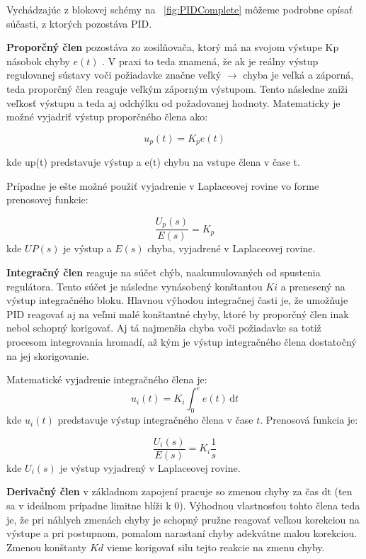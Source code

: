 Vychádzajúc z blokovej schémy na \figurename~\ref{fig:PIDComplete} môžeme podrobne opísať súčasti, z ktorých pozostáva \ac{PID}.

\textbf {Proporčný člen} pozostáva zo zosilňovača, ktorý má na svojom výstupe Kp násobok chyby $e(t)$ . V praxi to teda znamená, že ak je reálny výstup regulovanej sústavy voči požiadavke značne veľký $\rightarrow$ chyba je veľká a záporná, teda proporčný člen reaguje veľkým záporným výstupom. Tento následne zníži veľkosť výstupu a teda aj odchýlku od požadovanej hodnoty. Matematicky je možné vyjadriť výstup proporčného člena ako:

\begin{equation}
u_p (t)= K_p e( t )
\end{equation}

kde up(t) predstavuje výstup a e(t) chybu na vstupe člena v čase t. 

Prípadne je ešte možné použiť vyjadrenie v Laplaceovej rovine vo forme prenosovej funkcie:

\begin{equation}
\dfrac {U_p(s)} {E(s)} = K_p 
\end{equation}
kde $UP(s)$ je výstup a $E(s)$ chyba, vyjadrené v Laplaceovej rovine.

\textbf{Integračný člen} reaguje na súčet chýb, naakumulovaných od spustenia regulátora. Tento súčet je následne vynásobený konštantou $Ki$ a prenesený na výstup integračného bloku. Hlavnou výhodou integračnej časti je, že umožňuje \ac{PID} reagovať aj na veľmi malé konštantné chyby, ktoré by proporčný člen inak nebol schopný korigovať. Aj tá najmenšia chyba voči požiadavke sa totiž procesom integrovania hromadí, až kým je výstup integračného člena dostatočný na jej skorigovanie. 

Matematické vyjadrenie integračného člena je:
\begin{equation}
u_i (t)= K_i \int_0^e \! e( t ) \, \mathrm{d}t 
\end{equation}
kde $u_i(t)$ predstavuje výstup integračného člena v čase $t$. 
Prenosová funkcia je:

\begin{equation}
\dfrac{U_i(s)}{E(s)}  = K_i\dfrac{ 1}{s} 
\end{equation}
kde $U_i (s)$ je výstup vyjadrený v Laplaceovej rovine.

\textbf{Derivačný člen} v základnom zapojení pracuje so zmenou chyby za čas dt (ten sa v ideálnom prípadne limitne blíži k 0). Výhodnou vlastnosťou tohto člena teda je, že pri náhlych zmenách chyby je schopný pružne reagovať veľkou korekciou na výstupe a pri postupnom, pomalom narastaní chyby adekvátne malou korekciou. Zmenou konštanty $Kd$ vieme korigovať silu tejto reakcie na zmenu chyby.

